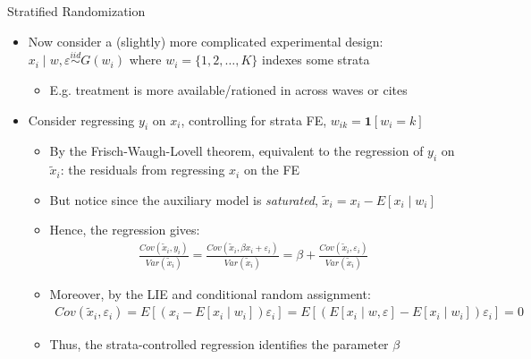 \documentclass[11pt, english]{beamer}
\begin{document}
	\begin{frame}{Stratified Randomization}
		\begin{itemize}
			\item Now consider a (slightly) more complicated experimental design:
				$x_{i}\mid w, \varepsilon \stackrel{iid}{\sim}G(w_{i})$ where
				$w_{i}=\{1,2,\dots,K\}$ indexes some strata
				\smallskip
				\pause{}
				\begin{itemize}
					\item E.g. treatment is more available/rationed in across waves or
						cites\pause{}
				\end{itemize}
				\medskip

			\item Consider regressing $y_{i}$ on $x_{i}$, controlling for strata FE, $w
				_{ik}=\mathbf{1}[w_{i}=k]$
				\smallskip
				\pause{}
				\begin{itemize}
					\item By the Frisch-Waugh-Lovell theorem, equivalent to the regression
						of $y_{i}$ on $\tilde{x}_{i}$: the residuals from regressing $x_{i}$
						on the FE
						\smallskip
						\pause{}

					\item But notice since the auxiliary model is \emph{saturated}, $\tilde
						{x}_{i}=x_{i}-E[x_{i}\mid w_{i}]$
						\smallskip
						\pause{}

					\item Hence, the regression gives:
						\vspace{-0.1cm}
						\begin{align*}
							\frac{Cov(\tilde{x}_{i},y_{i})}{Var(\tilde{x}_{i})}=\frac{Cov(\tilde{x}_{i},\beta x_{i}+\varepsilon_{i})}{Var(\tilde{x}_{i})}=\beta +\frac{Cov(\tilde{x}_{i},\varepsilon_{i})}{Var(\tilde{x}_{i})}
						\end{align*}\pause{}

					\item Moreover, by the LIE and conditional random assignment:
						\begin{align*}
							Cov(\tilde{x}_{i},\varepsilon_{i})=E[(x_{i}-E[x_{i}\mid w_{i}])\varepsilon_{i}]=E[(E[x_{i}\mid w,\varepsilon]-E[x_{i}\mid w_{i}])\varepsilon_{i}]=0
						\end{align*}
						\vspace{-0.5cm}
						\pause{}

					\item Thus, the strata-controlled regression identifies the parameter
						$\beta$
				\end{itemize}
		\end{itemize}
	\end{frame}
\end{document}

